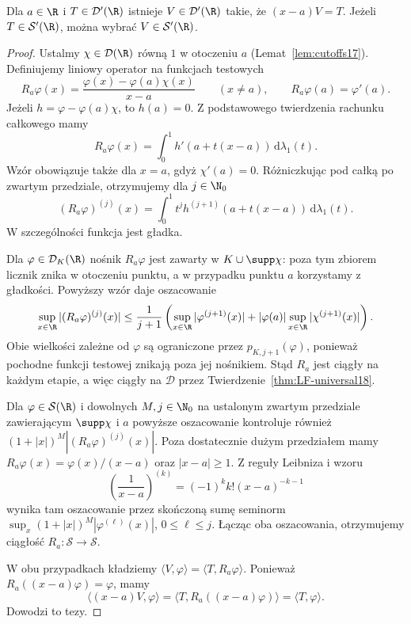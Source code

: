 \begin{lemat}
\label{lem:dt-division-linear}
Dla $a\in\R$ i $T\in\mathcal D'(\R)$ istnieje
$V\in\mathcal D'(\R)$ takie, że $(x-a)V=T$.
Jeżeli $T\in\mathcal S'(\R)$, można wybrać
$V\in\mathcal S'(\R)$.
\end{lemat}
\begin{proof}
Ustalmy $\chi\in\mathcal D(\R)$ równą $1$
w otoczeniu $a$ (Lemat~\ref{lem:cutoffs17}).
Definiujemy liniowy operator na funkcjach testowych
\[
 R_a\varphi(x)=
 \frac{\varphi(x)-\varphi(a)\chi(x)}{x-a}
 \qquad(x\ne a),
 \qquad R_a\varphi(a)=\varphi'(a).
\]
Jeżeli $h=\varphi-\varphi(a)\chi$, to $h(a)=0$.
Z podstawowego twierdzenia rachunku całkowego mamy
\[
 R_a\varphi(x)=\int_0^1 h'(a+t(x-a))\,\mathrm d\lambda_1(t).
\]
Wzór obowiązuje także dla $x=a$, gdyż $\chi'(a)=0$.
Różniczkując pod całką po zwartym przedziale,
otrzymujemy dla $j\in\N_0$
\[
 (R_a\varphi)^{(j)}(x)=
 \int_0^1 t^j h^{(j+1)}(a+t(x-a))\,\mathrm d\lambda_1(t).
\]
W szczególności funkcja jest gładka.

Dla $\varphi\in\mathcal D_K(\R)$ nośnik
$R_a\varphi$ jest zawarty w $K\cup\supp\chi$:
poza tym zbiorem licznik znika w otoczeniu punktu,
a w przypadku punktu $a$ korzystamy z gładkości.
Powyższy wzór daje oszacowanie
\[
 \sup_{x\in\R}|(R_a\varphi)^{(j)}(x)|
 \le \frac{1}{j+1}
 \left(\sup_{x\in\R}|\varphi^{(j+1)}(x)|
       +|\varphi(a)|\sup_{x\in\R}|\chi^{(j+1)}(x)|\right).
\]
Obie wielkości zależne od $\varphi$ są ograniczone
przez $p_{K,j+1}(\varphi)$, ponieważ pochodne
funkcji testowej znikają poza jej nośnikiem.
Stąd $R_a$ jest ciągły na każdym etapie,
a więc ciągły na $\mathcal D$ przez
Twierdzenie~\ref{thm:LF-universal18}.

Dla $\varphi\in\mathcal S(\R)$ i dowolnych $M,j\in\N_0$
na ustalonym zwartym przedziale zawierającym
$\supp\chi$ i $a$ powyższe oszacowanie kontroluje
również $(1+|x|)^M|(R_a\varphi)^{(j)}(x)|$.
Poza dostatecznie dużym przedziałem mamy
$R_a\varphi(x)=\varphi(x)/(x-a)$ oraz $|x-a|\ge1$.
Z reguły Leibniza i wzoru
\[
 \left(\frac1{x-a}\right)^{(k)}
 =(-1)^k k!(x-a)^{-k-1}
\]
wynika tam oszacowanie przez skończoną sumę
seminorm $\sup_x(1+|x|)^M|\varphi^{(\ell)}(x)|$,
$0\le\ell\le j$. Łącząc oba oszacowania,
otrzymujemy ciągłość $R_a:\mathcal S\to\mathcal S$.

W obu przypadkach kładziemy
$\langle V,\varphi\rangle=\langle T,R_a\varphi\rangle$.
Ponieważ $R_a((x-a)\varphi)=\varphi$,
mamy
\[
 \langle(x-a)V,\varphi\rangle
 =\langle T,R_a((x-a)\varphi)\rangle
 =\langle T,\varphi\rangle.
\]
Dowodzi to tezy.
\end{proof}

